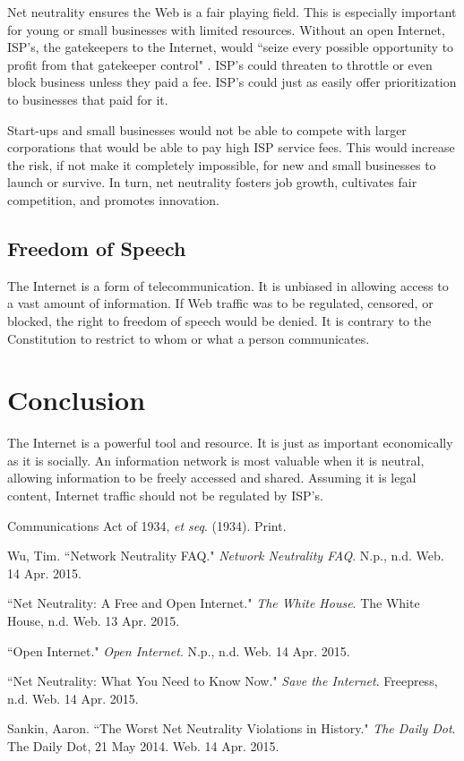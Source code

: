 \documentclass[11pt]{article}
\begin{document}
Net neutrality ensures the Web is a fair playing field.  This is especially important for young or small businesses with limited resources.  Without an open Internet, ISP's, the gatekeepers to the Internet, would ``seize every possible opportunity to profit from that gatekeeper control" \cite{FP}.  ISP's could threaten to throttle or even block business unless they paid a fee.  ISP's could just as easily offer prioritization to businesses that paid for it.

Start-ups and small businesses would not be able to compete with larger corporations that would be able to pay high ISP service fees.  This would increase the risk, if not make it completely impossible, for new and small businesses to launch or survive. In turn, net neutrality fosters job growth, cultivates fair competition, and promotes innovation.

\subsection{Freedom of Speech}
The Internet is a form of telecommunication.  It is unbiased in allowing access to a vast amount of information.  If Web traffic was to be regulated, censored, or blocked, the right to freedom of speech would be denied.  It is contrary to the Constitution to restrict to whom or what a person communicates.

\section{Conclusion}
The Internet is a powerful tool and resource.  It is just as important economically as it is socially.  An information network is most valuable when it is neutral, allowing information to be freely accessed and shared.  Assuming it is legal content, Internet traffic should not be regulated by ISP's.


\begin{thebibliography}{9}
	Communications Act of 1934,
  	\emph{et seq}.
  	(1934). Print.

	Wu, Tim.
	``Network Neutrality FAQ."
  	\emph{Network Neutrality FAQ}.
  	N.p., n.d. Web. 14 Apr. 2015.

	``Net Neutrality: A Free and Open Internet."
  	\emph{The White House}.
  	The White House, n.d. Web. 13 Apr. 2015.

	``Open Internet."
  	\emph{Open Internet}.
  	N.p., n.d. Web. 14 Apr. 2015.

	``Net Neutrality: What You Need to Know Now."
  	\emph{Save the Internet}.
  	Freepress, n.d. Web. 14 Apr. 2015.

	Sankin, Aaron.
	``The Worst Net Neutrality Violations in History."
  	\emph{The Daily Dot}.
  	The Daily Dot, 21 May 2014. Web. 14 Apr. 2015.
\end{thebibliography}
\end{document}
